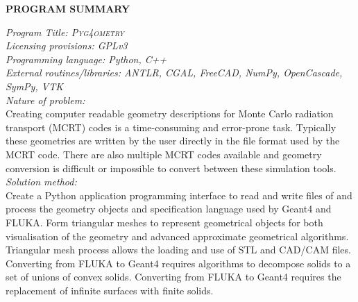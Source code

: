 \documentclass[final,5p,times,twocolumn]{elsarticle}
\newcommand{\PYGEOMETRY}{\textsc{Pyg4ometry}}
\begin{document}


\linenumbers

{\bf PROGRAM SUMMARY}

\begin{small}
\noindent
{\em Program Title: \PYGEOMETRY{} }                                         		\\
{\em Licensing provisions: GPLv3 }							\\
{\em Programming language: Python, C++}                         		\\
{\em External routines/libraries: ANTLR, CGAL, FreeCAD, NumPy, OpenCascade, SymPy, VTK} \\
{\em Nature of problem:}\\  %
Creating computer readable geometry descriptions for Monte Carlo radiation transport (MCRT) codes is a time-consuming and error-prone task. 
Typically these geometries are written by the user directly in the file format used by the MCRT code. There are also multiple MCRT codes 
available and geometry conversion is difficult or impossible to convert between these simulation tools. 
\\
{\em Solution method:}\\  %
Create a Python application programming interface to read and write files of and process the geometry objects and specification 
language used by Geant4 and FLUKA. Form triangular meshes to represent geometrical objects for both visualisation of the 
geometry and advanced approximate geometrical algorithms. Triangular mesh process allows the loading and use of STL and CAD/CAM 
files. Converting from FLUKA to Geant4 requires algorithms to decompose solids to a set of unions of convex solids. Converting from 
FLUKA to Geant4 requires the replacement of infinite surfaces with finite solids. 
 

\end{small}
\end{document}
